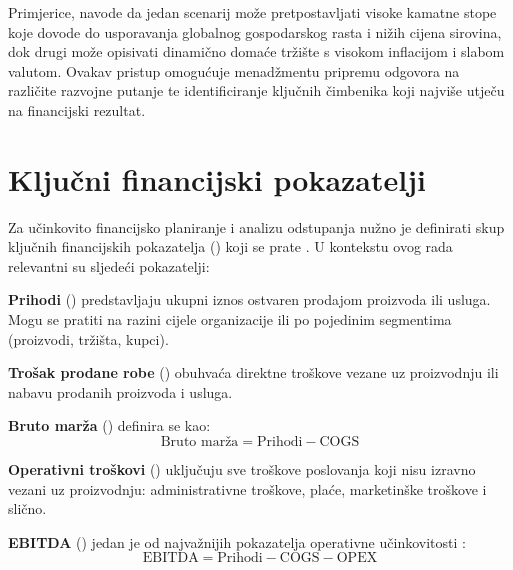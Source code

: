 \documentclass[zavrsnirad]{fer}
\begin{document}
Primjerice, \cite{brealey2020principles} navode da jedan scenarij mo\v{z}e pretpostavljati visoke kamatne stope koje dovode do usporavanja globalnog gospodarskog rasta i ni\v{z}ih cijena sirovina, dok drugi mo\v{z}e opisivati dinami\v{c}no doma\'{c}e tr\v{z}i\v{s}te s visokom inflacijom i slabom valutom. Ovakav pristup omogu\'{c}uje menad\v{z}mentu pripremu odgovora na razli\v{c}ite razvojne putanje te identificiranje klju\v{c}nih \v{c}imbenika koji najvi\v{s}e utje\v{c}u na financijski rezultat.

\section{Klju\v{c}ni financijski pokazatelji}
\label{sec:financijski_pokazatelji}

Za u\v{c}inkovito financijsko planiranje i analizu odstupanja nu\v{z}no je definirati skup klju\v{c}nih financijskih pokazatelja () koji se prate \citep{horngren2015cost}. U kontekstu ovog rada relevantni su sljede\'{c}i pokazatelji:

\textbf{Prihodi} () predstavljaju ukupni iznos ostvaren prodajom proizvoda ili usluga. Mogu se pratiti na razini cijele organizacije ili po pojedinim segmentima (proizvodi, tr\v{z}i\v{s}ta, kupci).

\textbf{Tro\v{s}ak prodane robe} () obuhva\'{c}a direktne tro\v{s}kove vezane uz proizvodnju ili nabavu prodanih proizvoda i usluga.

\textbf{Bruto mar\v{z}a} () definira se kao:
\begin{equation}
    \text{Bruto mar\v{z}a} = \text{Prihodi} - \text{COGS}
    \label{eq:bruto_marza}
\end{equation}

\textbf{Operativni tro\v{s}kovi} () uklju\v{c}uju sve tro\v{s}kove poslovanja koji nisu izravno vezani uz proizvodnju: administrativne tro\v{s}kove, pla\'{c}e, marketin\v{s}ke tro\v{s}kove i sli\v{c}no.

\textbf{EBITDA} () jedan je od najva\v{z}nijih pokazatelja operativne u\v{c}inkovitosti \citep{brealey2020principles}:
\begin{equation}
    \text{EBITDA} = \text{Prihodi} - \text{COGS} - \text{OPEX}
    \label{eq:ebitda}
\end{equation}
\end{document}
